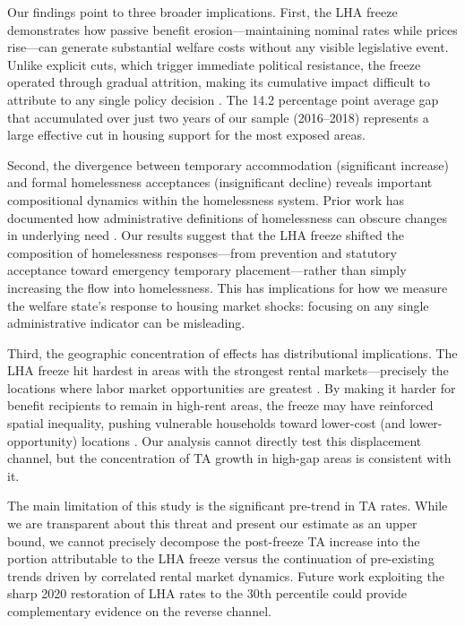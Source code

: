 \documentclass[12pt]{article}
\begin{document}
Our findings point to three broader implications. First, the LHA freeze demonstrates how passive benefit erosion---maintaining nominal rates while prices rise---can generate substantial welfare costs without any visible legislative event. Unlike explicit cuts, which trigger immediate political resistance, the freeze operated through gradual attrition, making its cumulative impact difficult to attribute to any single policy decision \citep{beatty2014}. The 14.2 percentage point average gap that accumulated over just two years of our sample (2016--2018) represents a large effective cut in housing support for the most exposed areas.

Second, the divergence between temporary accommodation (significant increase) and formal homelessness acceptances (insignificant decline) reveals important compositional dynamics within the homelessness system. Prior work has documented how administrative definitions of homelessness can obscure changes in underlying need \citep{bramley2017, fitzpatrick2016}. Our results suggest that the LHA freeze shifted the composition of homelessness responses---from prevention and statutory acceptance toward emergency temporary placement---rather than simply increasing the flow into homelessness. This has implications for how we measure the welfare state's response to housing market shocks: focusing on any single administrative indicator can be misleading.

Third, the geographic concentration of effects has distributional implications. The LHA freeze hit hardest in areas with the strongest rental markets---precisely the locations where labor market opportunities are greatest \citep{howard2021}. By making it harder for benefit recipients to remain in high-rent areas, the freeze may have reinforced spatial inequality, pushing vulnerable households toward lower-cost (and lower-opportunity) locations \citep{chetty2016, cutler1997}. Our analysis cannot directly test this displacement channel, but the concentration of TA growth in high-gap areas is consistent with it.

The main limitation of this study is the significant pre-trend in TA rates. While we are transparent about this threat and present our estimate as an upper bound, we cannot precisely decompose the post-freeze TA increase into the portion attributable to the LHA freeze versus the continuation of pre-existing trends driven by correlated rental market dynamics. Future work exploiting the sharp 2020 restoration of LHA rates to the 30th percentile could provide complementary evidence on the reverse channel.
\end{document}
